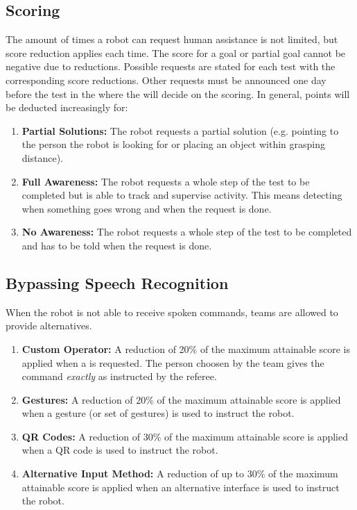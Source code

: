 \subsection{Scoring}
\label{sec:rules:demscoring}
The amount of times a robot can request human assistance is not limited, but score reduction applies each time. The score for a goal or partial goal cannot be negative due to  reductions. Possible  requests are stated for each test with the corresponding score reductions. Other requests must be announced one day before the test in the \TLM{} where the  will decide on the scoring. In general, points will be deducted increasingly for:
\begin{enumerate}
 	\item \textbf{Partial Solutions:} The robot requests a partial solution (e.g. pointing to the person the robot is looking for or placing an object within grasping distance).
 	
 	\item \textbf{Full Awareness:} The robot requests a whole step of the test to be completed but is able to track and supervise activity. This means detecting when something goes wrong and when the request is done.
 	
 	\item \textbf{No Awareness:} The robot requests a whole step of the test to be completed and has to be told when the request is done.
\end{enumerate}

\subsection{Bypassing Speech Recognition}
\label{sec:rules:asrcontinue}
When the robot is not able to receive spoken commands, teams are allowed to provide alternatives.

\begin{enumerate}
	\item \textbf{Custom Operator:} A reduction of 20\% of the maximum attainable score is applied when a \CustomOperator{} is requested. The person choosen by the team gives the command \emph{exactly} as instructed by the referee.

	\item \textbf{Gestures:} A reduction of 20\% of the maximum attainable score is applied when a gesture (or set of gestures) is used to instruct the robot.

	\item \textbf{QR Codes:} A reduction of 30\% of the maximum attainable score is applied when a QR code is used to instruct the robot.

	\item \textbf{Alternative Input Method:} A reduction of up to 30\% of the maximum attainable score is applied when an alternative  interface is used to instruct the robot.
\end{enumerate}


